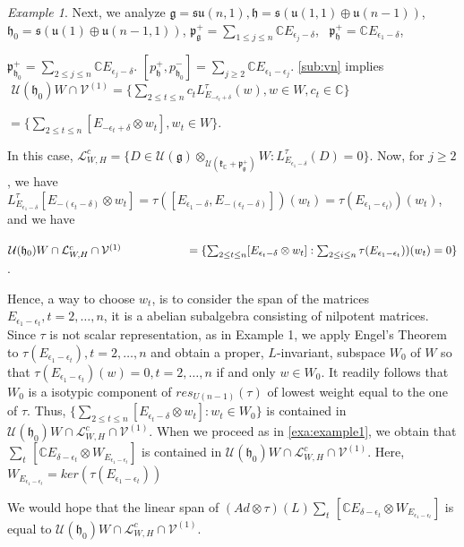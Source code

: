 \documentclass[12pt]{amsart}
\theoremstyle{definition}
\theoremstyle{remark}
\newtheorem{examp}[thm]{Example}
\newcommand{\g}{\mathfrak{g}}
\newcommand{\h}{\mathfrak{h}}
\renewcommand{\k}{{\mathfrak k}}
\newcommand{\p}{\mathfrak p}
\newcommand{\C}{{\mathbb C}}
\numberwithin{equation}{section}
\begin{document}
\begin{examp}\label{exa:example2} Next, we analyze   $\g=\mathfrak{su}(n,1), \h =\mathfrak{s}( \mathfrak{u}(1,1) \oplus \mathfrak u(n-1))  $,   $\h_0 =\mathfrak s(\mathfrak u( 1)\oplus \mathfrak{u}(n-1,1))  $, $\p_\g^+=\sum_{1\leq j \leq n}\C E_{\epsilon_j -\delta}$, $\,\,\, \p_{\h}^+= \C E_{\epsilon_1 -\delta}$,

  $\p_{\h_0}^+ =\sum_{2\leq j\leq n}   \C E_{\epsilon_j -\delta}$.  $[p_{\h}^+, p_{\h_0}^- ]=\sum_{j\geq 2} \C E_{\epsilon_1 -\epsilon_j}$.  \ref{sub:vn} implies \\
 $\,\, \mathcal U(\h_0)W\cap \mathcal V^{(1)}= \{\sum_{2\leq t \leq n} c_t L_{ E_{-\epsilon_t +\delta}}^\tau(w), w \in W , c_t \in \C \}$

  $=\{ \sum_{2\leq t \leq n} [E_{-\epsilon_t +\delta}\otimes w_t ], w_t \in W   \}$.




In this case,  $\mathcal L_{W,H}^c=\{ D \in \mathcal U(\g) \otimes_{\mathcal U(\k_\C +\p_\g^+)} W: L_{E_{\epsilon_1 -\delta}}^\tau (D)=0  \}$. Now,  for $j\geq 2$, we have  $ L_{E_{\epsilon_1 -\delta}}^\tau [E_{-(\epsilon_t -\delta)} \otimes w_t] =\tau([E_{\epsilon _1 -\delta}, E_{-(\epsilon_t -\delta)}])(w_t)=\tau(E_{\epsilon_1 -\epsilon_t)})(w_t) $, and   we have

 $\mathcal U(\h_0)W\cap \mathcal L_{W,H}^c\cap \mathcal V^{(1)} \\ \phantom{xxxxxxxxxx}=\{ \sum_{2\leq t \leq n}[E_{\epsilon_t-\delta} \otimes w_t]  :   \sum_{2\leq i\leq n} \tau(E_{\epsilon_1 -\epsilon_t}))(w_t) =0\}$.


Hence,
 a way  to choose   $w_t  $, is to  consider the span  of the  matrices $E_{\epsilon_1-\epsilon_t}, t=2, \dots,n$, it is a abelian subalgebra consisting of nilpotent matrices. Since $\tau$ is not scalar representation, as in Example 1, we apply Engel's Theorem to $\tau(E_{\epsilon_1-\epsilon_t}), t=2, \dots,n$ and obtain a proper, $L$-invariant, subspace $W_0$ of $W$ so that $\tau(E_{\epsilon_1-\epsilon_t})(w)=0, t=2, \dots,n$ if and only $w \in W_0$.  It readily follows that $W_0$
 is a isotypic component of $res_{U(n-1)}(\tau)$ of lowest weight equal to the one of $\tau$. Thus, $\{\sum_{2\leq t \leq n}[E_{\epsilon_t-\delta} \otimes w_t]  : w_t \in W_0 \}$ is contained in $\mathcal U(\h_0)W\cap \mathcal L_{W,H}^c\cap \mathcal V^{(1)}$.  When we   proceed as in \ref{exa:example1}, we obtain that $\sum_t \, [\C E_{\delta-\epsilon_t } \otimes W_{E_{\epsilon_1-\epsilon_t }}]$ is contained in $\mathcal U(\h_0)W\cap \mathcal L_{W,H}^c\cap \mathcal V^{(1)}$. Here, $ W_{E_{\epsilon_1-\epsilon_t }}=ker(\tau(E_{\epsilon_1-\epsilon_t }))$


 We would hope that  the linear span of   $(Ad\otimes \tau) (L)\sum_t \, [\C E_{\delta-\epsilon_t } \otimes W_{E_{\epsilon_1-\epsilon_t }}]$ is  equal to $\mathcal U(\h_0)W\cap \mathcal L_{W,H}^c\cap \mathcal V^{(1)}$.\end{examp}
\end{document}
